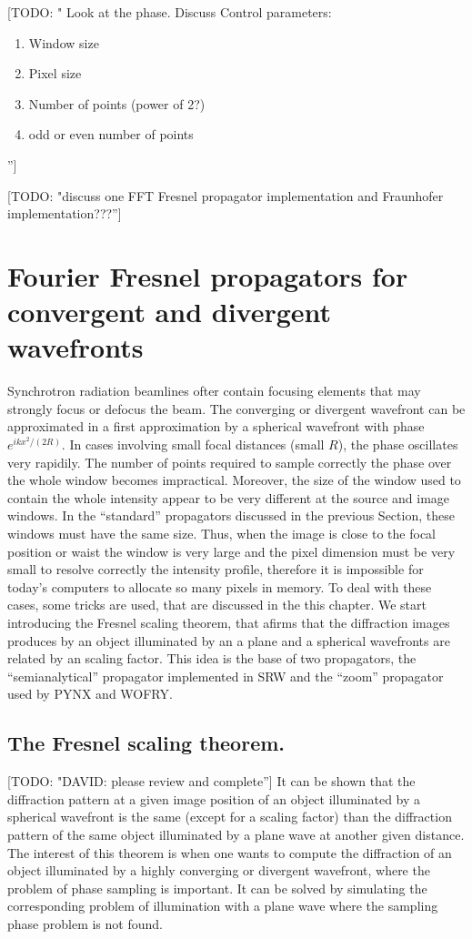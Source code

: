 \documentclass{iucr}              %
\newcommand{\todo}[1]{{\color{red}[TODO: "#1'']}}
\begin{document}
\todo{ Look at the phase. Discuss Control parameters: 
\begin{enumerate}
\item Window size
\item Pixel size
\item Number of points (power of 2?)
\item odd or even number of points
\end{enumerate}
 
}

\todo{discuss one FFT Fresnel propagator implementation and Fraunhofer implementation???}

\section{Fourier Fresnel propagators for convergent and divergent wavefronts}
\label{ch: spherical fronts}

Synchrotron radiation beamlines ofter contain focusing elements that may strongly focus or defocus the beam. The converging or divergent wavefront can be approximated in a first approximation by a spherical wavefront with phase $e^{i k x^2 / (2 R)}$. In cases involving small focal distances (small $R$), the phase oscillates very rapidily. The number of points required to sample correctly the phase over the whole window becomes impractical. Moreover, the size of the window used to contain the whole intensity appear to be very different at the source and image windows. In the ``standard'' propagators discussed in the previous Section, these windows must have the same size. Thus, when the image is close to the focal position or waist the window is very large and the pixel dimension must be very small to resolve correctly the intensity profile, therefore it is impossible for today's computers to allocate so many pixels in memory. To deal with these cases, some tricks are used, that are discussed in the this chapter. We start introducing the Fresnel scaling theorem, that afirms that the diffraction images produces by an object illuminated by an a plane and a spherical wavefronts are related by an scaling factor. This idea is the base of two propagators, the ``semianalytical'' propagator implemented in SRW and the ``zoom'' propagator used by PYNX and WOFRY.    

\subsection{The Fresnel scaling theorem.}
\label{subch: Fresnel scaling}
\todo{DAVID: please review and complete}
It can be shown that the diffraction pattern at a given image position of an object illuminated by a spherical wavefront is the same (except for a scaling factor) than the diffraction pattern of the same object illuminated by a plane wave at another given distance. 
The interest of this theorem is when one wants to compute the diffraction of an object illuminated by a highly converging or divergent wavefront, where the problem of phase sampling is important. It can be solved by simulating the corresponding problem of illumination with a plane wave where the sampling phase problem is not found.
\end{document}
